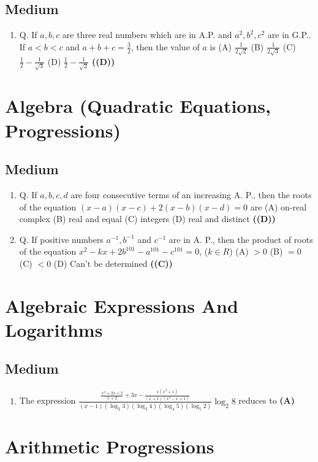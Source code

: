 \documentclass{article}
\begin{document}
\subsection{Medium}
\begin{enumerate}
\item Q. If $a, b, c$ are three real numbers which are in A.P. and $a^2, b^2, c^2$ are in G.P.. If $a < b < c$ and $a + b + c = \frac{3}{2}$, then the value of $a$ is
(A) $\frac{1}{2\sqrt{2}}$
(B) $\frac{1}{2\sqrt{3}}$
(C) $\frac{1}{2} - \frac{1}{\sqrt{3}}$
(D) $\frac{1}{2} - \frac{1}{\sqrt{2}}$ \hfill \textbf{((D))}
\end{enumerate}
\section{Algebra (Quadratic Equations, Progressions)}
\subsection{Medium}
\begin{enumerate}
\item Q. If $a, b, c, d$ are four consecutive terms of an increasing A. P., then the roots of the equation $(x - a)(x - c) + 2(x - b)(x - d) = 0$ are
(A) on-real complex
(B) real and equal
(C) integers
(D) real and distinct \hfill \textbf{((D))}
\item Q. If positive numbers $a^{-1}, b^{-1}$ and $c^{-1}$ are in A. P., then the product of roots of the equation $x^2 - kx + 2b^{101} - a^{101} - c^{101} = 0$, ($k \in R$)
(A) $> 0$
(B) $= 0$
(C) $< 0$
(D) Can't be determined \hfill \textbf{((C))}
\end{enumerate}
\section{Algebraic Expressions And Logarithms}
\subsection{Medium}
\begin{enumerate}
\item The expression $\frac{\frac{x^2 + 3x + 2}{x+2} + 3x - \frac{x(x^3 + 1)}{(x + 1)(x^2 - x + 1)}}{(x - 1) (\log_2 3) (\log_3 4) (\log_4 5) (\log_5 2)} \log_2 8$ reduces to \hfill \textbf{(A)}
\end{enumerate}
\section{Arithmetic Progressions}
\end{document}
